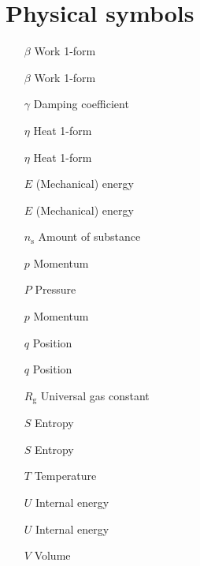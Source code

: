 \section*{Physical symbols}
\begin{itemize}[itemsep=0pt, leftmargin=2cm, labelsep=0cm, labelwidth=1.9cm, align=left]
    \item[$\beta$] Work 1-form
    \item[$\beta$] Work 1-form
    \item[$\gamma$] Damping coefficient
    \item[$\eta$] Heat 1-form
    \item[$\eta$] Heat 1-form
%
    \item[$E$] (Mechanical) energy
    \item[$E$] (Mechanical) energy
    \item[$n_\text{s}$] Amount of substance
    \item[$p$] Momentum
    \item[$P$] Pressure
    \item[$p$] Momentum
    \item[$q$] Position
    \item[$q$] Position
    \item[$R_\text{g}$] Universal gas constant
    \item[$S$] Entropy
    \item[$S$] Entropy
    \item[$T$] Temperature
    \item[$U$] Internal energy
    \item[$U$] Internal energy
    \item[$V$] Volume
%
%
%
\end{itemize}
